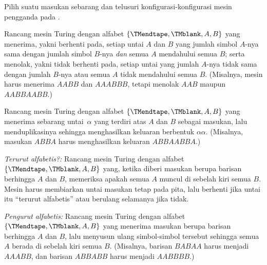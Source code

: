 \documentclass[../../../include/open-logic-section]{subfiles}
\begin{document}
\begin{prob}
Pilih suatu masukan sebarang dan telusuri konfigurasi-konfigurasi mesin
pengganda pada .
\end{prob}

\begin{prob}
Rancang mesin Turing dengan alfabet $\{\TMendtape,\TMblank, A, B\}$ yang
menerima, yakni berhenti pada, setiap untai $A$ dan $B$ yang jumlah simbol
$A$-nya sama dengan jumlah simbol $B$-nya \emph{dan} semua $A$ mendahului
semua $B$; serta menolak, yakni tidak berhenti pada, setiap untai yang jumlah
$A$-nya tidak sama dengan jumlah $B$-nya atau semua $A$ tidak mendahului semua
$B$. (Misalnya, mesin harus menerima $AABB$ dan $AAABBB$, tetapi menolak
$AAB$ maupun $AABBAABB$.)
\end{prob}

\begin{prob}
Rancang mesin Turing dengan alfabet $\{\TMendtape,\TMblank, A, B\}$ yang
menerima sebarang untai~$\alpha$ yang terdiri atas $A$ dan $B$ sebagai masukan,
lalu menduplikasinya sehingga menghasilkan keluaran berbentuk
$\alpha\alpha$. (Misalnya, masukan $ABBA$ harus menghasilkan keluaran
$ABBAABBA$.)
\end{prob}

\begin{prob}
\emph{Terurut alfabetis?:} Rancang mesin Turing dengan alfabet
$\{\TMendtape,\TMblank, A, B\}$ yang, ketika diberi masukan berupa barisan
berhingga $A$ dan $B$, memeriksa apakah semua $A$ muncul di sebelah kiri semua
$B$. Mesin harus membiarkan untai masukan tetap pada pita, lalu berhenti jika
untai itu ``terurut alfabetis'' atau berulang selamanya jika tidak.
\end{prob}

\begin{prob}
\emph{Pengurut alfabetis:} Rancang mesin Turing dengan alfabet
$\{\TMendtape,\TMblank, A, B\}$ yang menerima masukan berupa barisan berhingga
$A$ dan $B$, lalu menyusun ulang simbol-simbol tersebut sehingga semua $A$
berada di sebelah kiri semua $B$. (Misalnya, barisan $BABAA$ harus menjadi
$AAABB$, dan barisan $ABBABB$ harus menjadi $AABBBB$.)
\end{prob}
\end{document}

